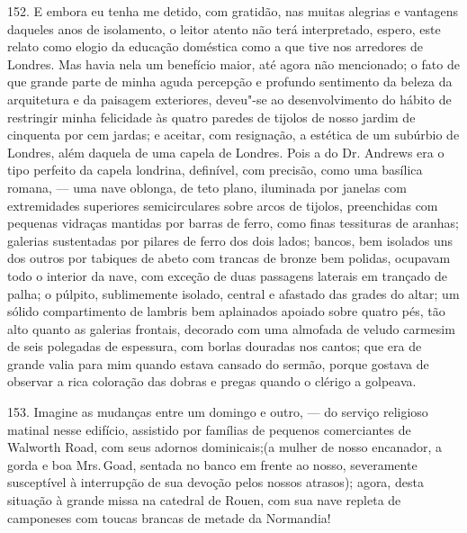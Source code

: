 152. E embora eu tenha me detido, com gratidão, nas muitas alegrias e
vantagens daqueles anos de isolamento, o leitor atento não terá
interpretado, espero, este relato como elogio da educação doméstica como
a que tive nos arredores de Londres. Mas havia nela um benefício maior,
até agora não mencionado; o fato de que grande parte de minha aguda
percepção e profundo sentimento da beleza da arquitetura e da paisagem
exteriores, deveu"-se ao desenvolvimento do hábito de restringir minha
felicidade às quatro paredes de tijolos de nosso jardim de cinquenta por
cem jardas; e aceitar, com resignação, a estética de um subúrbio de
Londres, além daquela de uma capela de Londres. Pois a do Dr. Andrews
era o tipo perfeito da capela londrina, definível, com precisão, como
uma basílica romana, --- uma nave oblonga, de teto plano, iluminada por
janelas com extremidades superiores semicirculares sobre arcos de
tijolos, preenchidas com pequenas vidraças mantidas por barras de ferro,
como finas tessituras de aranhas; galerias sustentadas por pilares de
ferro dos dois lados; bancos, bem isolados uns dos outros por tabiques
de abeto com trancas de bronze bem polidas, ocupavam todo o interior da
nave, com exceção de duas passagens laterais em trançado de palha; o
púlpito, sublimemente isolado, central e afastado das grades do altar;
um sólido compartimento de lambris bem aplainados apoiado sobre quatro
pés, tão alto quanto as galerias frontais, decorado com uma almofada de
veludo carmesim de seis polegadas de espessura, com borlas douradas nos
cantos; que era de grande valia para mim quando estava cansado do
sermão, porque gostava de observar a rica coloração das dobras e pregas
quando o clérigo a golpeava.

153. Imagine as mudanças entre um domingo e outro, --- do serviço
religioso matinal nesse edifício, assistido por famílias de pequenos
comerciantes de Walworth Road, com seus adornos dominicais;(a mulher de
nosso encanador, a gorda e boa Mrs.\,Goad, sentada no banco em frente ao
nosso, severamente susceptível à interrupção de sua devoção pelos nossos
atrasos); agora, desta situação à grande missa na catedral de Rouen, com
sua nave repleta de camponeses com toucas brancas de metade da
Normandia!

